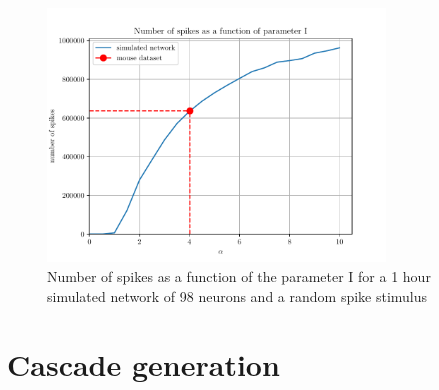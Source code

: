 \begin{figure}[H]
	\centering
	\includegraphics[width=0.8\textwidth]{I_var_plot.pdf}
	\caption{Number of spikes as a function of the parameter I for a 1 hour simulated network of 98 neurons and a random spike stimulus}
	\label{fig:I_var_plot}
\end{figure}





\section{Cascade generation}\label{sec:simulating_cascade_generation}

